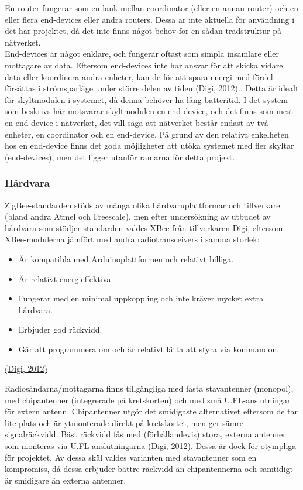 \documentclass[a4paper,11pt]{article}
\begin{document}
En router fungerar som en länk mellan coordinator (eller en annan router) och en eller flera end-devices eller andra routers. Dessa är inte aktuella för användning i det här projektet, då det inte finns något behov för en sådan trädstruktur på nätverket. \\

End-devices är något enklare, och fungerar oftast som simpla insamlare eller mottagare av data. Eftersom end-devices inte har ansvar för att skicka vidare data eller koordinera andra enheter, kan de för att spara energi med fördel försättas i strömsparläge under större delen av tiden \hyperref[digi]{(Digi, 2012)}.. Detta är idealt för skyltmodulen i systemet, då denna behöver ha lång batteritid. I det system som beskrivs här motsvarar skyltmodulen en end-device, och det finns som mest en end-device i nätverket, det vill säga att nätverket består endast av två enheter, en coordinator och en end-device. På grund av den relativa enkelheten hos en end-device finns det goda möjligheter att utöka systemet med fler skyltar (end-devices), men det ligger utanför ramarna för detta projekt.

\subsubsection{Hårdvara}
ZigBee-standarden stöds av många olika hårdvaruplattformar och tillverkare (bland andra Atmel och Freescale), men efter undersökning av utbudet av hårdvara som stödjer standarden valdes XBee från tillverkaren Digi, eftersom XBee-modulerna jämfört med andra radiotransceivers i samma storlek:
	
	\begin{itemize}
	\item Är kompatibla med Arduinoplattformen och relativt billiga.
    	\item Är relativt energieffektiva.
    	\item Fungerar med en minimal uppkoppling och inte kräver mycket extra hårdvara.
    	\item Erbjuder god räckvidd.
    	\item Går att programmera om och är relativt lätta att styra via kommandon.
	\end{itemize}
\hyperref[digi]{(Digi, 2012)}
	
Radiosändarna/mottagarna finns tillgängliga med fasta stavantenner (monopol), med chipantenner (integrerade på kretskorten) och med små U.FL-anslutningar för extern antenn.
Chipantenner utgör det smidigaste alternativet eftersom de tar lite plats och är ytmonterade direkt på kretskortet, men ger sämre signalräckvidd. Bäst räckvidd fås med (förhållandevis) stora, externa antenner som monteras via U.FL-anslutningarna \hyperref[digi]{(Digi, 2012)}. Dessa är dock för otympliga för projektet. Av dessa skäl valdes varianten med stavantenner som en kompromiss, då dessa erbjuder bättre räckvidd än chipantennerna och samtidigt är smidigare än externa antenner. \\
\end{document}
